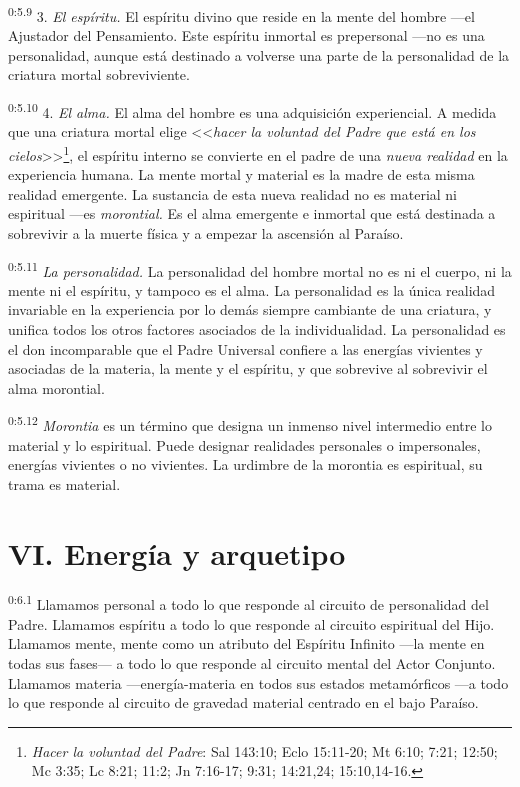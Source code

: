 \par
\textsuperscript{0:5.9} 3. \textit{El espíritu.} El espíritu divino que reside en la mente del hombre ---el Ajustador del Pensamiento. Este espíritu inmortal es prepersonal ---no es una personalidad, aunque está destinado a volverse una parte de la personalidad de la criatura mortal sobreviviente.

\par
\textsuperscript{0:5.10} 4. \textit{El alma.} El alma del hombre es una adquisición experiencial. A medida que una criatura mortal elige <<\textit{hacer la voluntad del Padre que está en los cielos}>>\footnote{\textit{Hacer la voluntad del Padre}: Sal 143:10; Eclo 15:11-20; Mt 6:10; 7:21; 12:50; Mc 3:35; Lc 8:21; 11:2; Jn 7:16-17; 9:31; 14:21,24; 15:10,14-16.}, el espíritu interno se convierte en el padre de una \textit{nueva realidad} en la experiencia humana. La mente mortal y material es la madre de esta misma realidad emergente. La sustancia de esta nueva realidad no es material ni espiritual ---es \textit{morontial.} Es el alma emergente e inmortal que está destinada a sobrevivir a la muerte física y a empezar la ascensión al Paraíso.

\par
\textsuperscript{0:5.11} \textit{La personalidad.} La personalidad del hombre mortal no es ni el cuerpo, ni la mente ni el espíritu, y tampoco es el alma. La personalidad es la única realidad invariable en la experiencia por lo demás siempre cambiante de una criatura, y unifica todos los otros factores asociados de la individualidad. La personalidad es el don incomparable que el Padre Universal confiere a las energías vivientes y asociadas de la materia, la mente y el espíritu, y que sobrevive al sobrevivir el alma morontial.

\par
\textsuperscript{0:5.12} \textit{Morontia} es un término que designa un inmenso nivel intermedio entre lo material y lo espiritual. Puede designar realidades personales o impersonales, energías vivientes o no vivientes. La urdimbre de la morontia es espiritual, su trama es material.

\section*{VI. Energía y arquetipo}
\par
\textsuperscript{0:6.1} Llamamos personal a todo lo que responde al circuito de personalidad del Padre. Llamamos espíritu a todo lo que responde al circuito espiritual del Hijo. Llamamos mente, mente como un atributo del Espíritu Infinito ---la mente en todas sus fases--- a todo lo que responde al circuito mental del Actor Conjunto. Llamamos materia ---energía-materia en todos sus estados metamórficos ---a todo lo que responde al circuito de gravedad material centrado en el bajo Paraíso.


